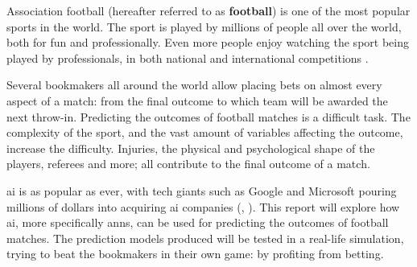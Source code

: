 Association football (hereafter referred to as \textbf{football}) is one of the most popular sports in the world. The sport is played by millions of people all over the world, both for fun and professionally. Even more people enjoy watching the sport being played by professionals, in both national and international competitions \citep{bib:fifa}.

Several bookmakers all around the world allow placing bets on almost every aspect of a match: from the final outcome to which team will be awarded the next throw-in. Predicting the outcomes of football matches is a difficult task. The complexity of the sport, and the vast amount of variables affecting the outcome, increase the difficulty. Injuries, the physical and psychological shape of the players, referees and more; all contribute to the final outcome of a match.

\gls{ai} is as popular as ever, with tech giants such as Google and Microsoft pouring millions of dollars into acquiring \gls{ai} companies (\citet{bib:deepmind}, \citet{bib:maluuba}). This report will explore how \gls{ai}, more specifically \glspl{ann}, can be used for predicting the outcomes of football matches. The prediction models produced will be tested in a real-life simulation, trying to beat the bookmakers in their own game: by profiting from betting.